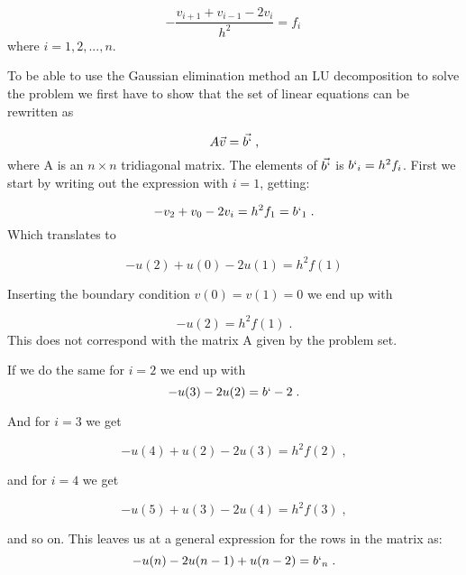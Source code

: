 \documentclass[english,a4paper, 11pt]{article}
\begin{document}
\begin{equation}
-\frac{v_{i+1} + v_{i-1} - 2v_i}{h^2} = f_i \, 
\label{eq5}
\end{equation}
where $i = 1, 2,..., n$.

To be able to use the Gaussian elimination method an LU decomposition to solve the problem we first have to show that the set of linear equations can be rewritten as 

\begin{equation}
A\vec{v} = \vec{b`} \;,
\label{eq6}
\end{equation}
 where A is an $n \times n$ tridiagonal matrix. The elements of $\vec{b`}$ is $b`_i = h^2f_i$. First we start by writing out the expression with $i=1$, getting:
 
 \begin{equation}
 -v_2 + v_0 -2v_i = h^2f_1 = b`_1\;.
 \label{eq7}
 \end{equation}
 Which translates to
 
 \begin{equation}
 -u(2) + u(0) - 2u(1) = h^2f(1)
 \label{eq8}
 \end{equation}
 
Inserting the boundary condition $v(0)= v(1) = 0$ we end up with

\begin{equation}
-u(2) = h^2f(1)\;.
\label{eq9}
\end{equation}
This does not correspond with the matrix A given by the problem set.

 If we do the same for $i=2$ we end up with
 \begin{equation}
 -u(3) -2u(2) = b`-2\;.
 \label{eq10}
 \end{equation}
  
 And for $i = 3$  we get 
 
 \begin{equation}
 -u(4) + u(2) - 2u(3) = h^2f(2)\;,
 \label{eq11}
 \end{equation}
 
 and for $i = 4$ we get
 
 \begin{equation}
 -u(5) + u(3) -2u(4) = h^2f(3)\;,
 \label{eq12}
 \end{equation}
 
 and so on. This leaves us at a general expression for the rows in the matrix as:
 \begin{equation}
 -u(n)  - 2u(n-1) + u(n-2)= b`_n\;.
 \label{eq13}
 \end{equation}
 
\end{document}
